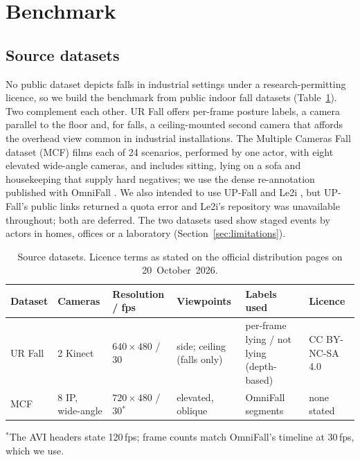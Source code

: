 \section{Benchmark}
\label{sec:benchmark}

\subsection{Source datasets}
No public dataset depicts falls in industrial settings under a research-permitting licence, so we build the benchmark from public indoor fall datasets (Table~\ref{tab:datasets}). Two complement each other. UR Fall \cite{kwolek2014urfall} offers per-frame posture labels, a camera parallel to the floor and, for falls, a ceiling-mounted second camera that affords the overhead view common in industrial installations. The Multiple Cameras Fall dataset (MCF) \cite{auvinet2010mcfd} films each of 24 scenarios, performed by one actor, with eight elevated wide-angle cameras, and includes sitting, lying on a sofa and housekeeping that supply hard negatives; we use the dense re-annotation published with OmniFall \cite{schneider2025omnifall}. We also intended to use UP-Fall \cite{martinez2019upfall} and Le2i \cite{charfi2013le2i}, but UP-Fall's public links returned a quota error and Le2i's repository was unavailable throughout; both are deferred. The two datasets used show staged events by actors in homes, offices or a laboratory (Section~\ref{sec:limitations}).

\begin{table}[t]
\centering
\caption{Source datasets. Licence terms as stated on the official distribution pages on 20~October~2026.}
\label{tab:datasets}
\footnotesize
\setlength{\tabcolsep}{4pt}
\begin{tabular}{llllll}
\toprule
Dataset & Cameras & Resolution / fps & Viewpoints & Labels used & Licence \\
\midrule
UR Fall \cite{kwolek2014urfall} & 2 Kinect & $640{\times}480$ / 30 & side; ceiling (falls only) & per-frame lying / not lying (depth-based) & CC BY-NC-SA 4.0 \\
MCF \cite{auvinet2010mcfd} & 8 IP, wide-angle & $720{\times}480$ / 30$^\ast$ & elevated, oblique & OmniFall segments \cite{schneider2025omnifall} & none stated \\
\bottomrule
\end{tabular}

\smallskip
\raggedright\footnotesize $^\ast$The AVI headers state 120\,fps; frame counts match OmniFall's timeline at 30\,fps, which we use.
\end{table}

